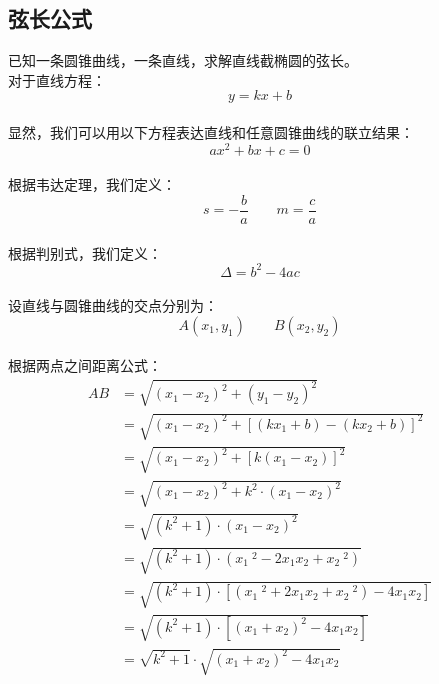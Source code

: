 \documentclass[UTF8]{ctexart}
\begin{document}
\newpage

\subsection{弦长公式}
    已知一条圆锥曲线，一条直线，求解直线截椭圆的弦长。\\[3mm]
    对于直线方程：
    \setcounter{equation}{0}
    \begin{equation}
        y=kx+b
    \end{equation}\\
    显然，我们可以用以下方程表达直线和任意圆锥曲线的联立结果：
    \begin{equation}
        ax^2+bx+c=0
    \end{equation}\\
    根据韦达定理，我们定义：
    \begin{equation}
        s=-\frac{b}{a}\qquad m=\frac{c}{a}
    \end{equation}\\
    根据判别式，我们定义：
    \begin{equation}
        \Delta=b^2-4ac
    \end{equation}\\[1mm]
    设直线与圆锥曲线的交点分别为：
    \begin{equation}
        A(x_1,y_1)\qquad B(x_2,y_2)
    \end{equation}\\
    根据两点之间距离公式：
    \begin{align}
        AB&=\sqrt{(x_1-x_2)^2+(y_1-y_2)^2}\\[3mm]
        &=\sqrt{(x_1-x_2)^2+\left[(kx_1+b)-(kx_2+b)\right]^2}\\[3mm]
        &=\sqrt{(x_1-x_2)^2+\left[k(x_1-x_2)\right]^2}\\[3mm]
        &=\sqrt{(x_1-x_2)^2+k^2\cdot(x_1-x_2)^2}\\[3mm]
        &=\sqrt{(k^2+1)\cdot(x_1-x_2)^2}\\[3mm]
        &=\sqrt{(k^2+1)\cdot(x_1~^2-2x_1x_2+x_2~^2)}\\[3mm]
        &=\sqrt{(k^2+1)\cdot\left[(x_1~^2+2x_1x_2+x_2~^2)-4x_1x_2\right]}\\[3mm]
        &=\sqrt{(k^2+1)\cdot\left[(x_1+x_2)^2-4x_1x_2\right]}\\[3mm]
        &=\sqrt{k^2+1}\cdot\sqrt{(x_1+x_2)^2-4x_1x_2}
    \end{align}

\newpage
\end{document}
